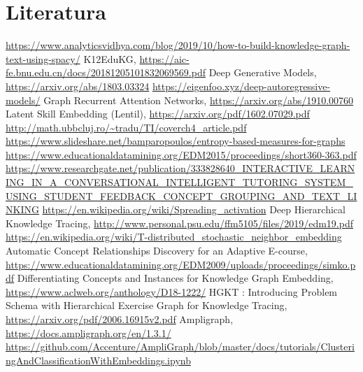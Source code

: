 \documentclass[times, utf8,projekt]{fer}
\begin{document}
\chapter{Literatura}
\renewcommand{\bibsection}{}
\begin{thebibliography}{99}
 \url{https://www.analyticsvidhya.com/blog/2019/10/how-to-build-knowledge-graph-text-using-spacy/}
 K12EduKG, \url{https://aic-fe.bnu.edu.cn/docs/20181205101832069569.pdf}
 Deep Generative Models, \url{https://arxiv.org/abs/1803.03324}
 \url{https://eigenfoo.xyz/deep-autoregressive-models/}
 Graph Recurrent Attention Networks, \url{https://arxiv.org/abs/1910.00760}
 Latent Skill Embedding (Lentil), \url{https://arxiv.org/pdf/1602.07029.pdf}
 \url{http://math.ubbcluj.ro/~tradu/TI/coverch4_article.pdf}
 \url{https://www.slideshare.net/bamparopoulos/entropy-based-measures-for-graphs}
 \url{https://www.educationaldatamining.org/EDM2015/proceedings/short360-363.pdf}
 \url{https://www.researchgate.net/publication/333828640_INTERACTIVE_LEARNING_IN_A_CONVERSATIONAL_INTELLIGENT_TUTORING_SYSTEM_USING_STUDENT_FEEDBACK_CONCEPT_GROUPING_AND_TEXT_LINKING}
 \url{https://en.wikipedia.org/wiki/Spreading_activation}
 Deep Hierarchical Knowledge Tracing, \url{http://www.personal.psu.edu/ffm5105/files/2019/edm19.pdf}
 \url{https://en.wikipedia.org/wiki/T-distributed_stochastic_neighbor_embedding}
 Automatic Concept Relationships Discovery for an Adaptive E-course, \url{https://www.educationaldatamining.org/EDM2009/uploads/proceedings/simko.pdf}
 Differentiating Concepts and Instances for Knowledge Graph Embedding, \url{https://www.aclweb.org/anthology/D18-1222/}
 HGKT : Introducing Problem Schema with Hierarchical Exercise Graph for Knowledge Tracing, \url{https://arxiv.org/pdf/2006.16915v2.pdf}
 Ampligraph, \url{https://docs.ampligraph.org/en/1.3.1/}
 \url{https://github.com/Accenture/AmpliGraph/blob/master/docs/tutorials/ClusteringAndClassificationWithEmbeddings.ipynb}

\end{thebibliography}
\end{document}
